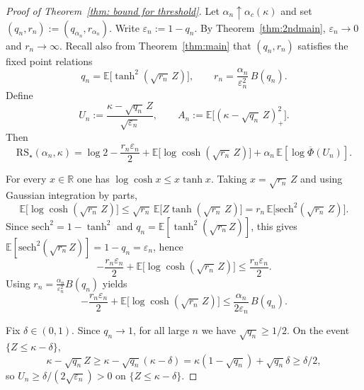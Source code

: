 \documentclass[11pt]{article}
\begin{document}
\begin{proof}[Proof of Theorem~\ref{thm: bound for threshold}]
Let $\alpha_n\uparrow \alpha_c(\kappa)$ and set $(q_n,r_n):=(q_{\alpha_n},r_{\alpha_n})$.
Write $\varepsilon_n:=1-q_n$. By Theorem~\ref{thm:2ndmain}, $\varepsilon_n\to 0$ and $r_n\to\infty$.
Recall also from Theorem~\ref{thm:main} that $(q_n,r_n)$ satisfies the fixed point relations
\[
q_n=\mathbb E\big[\tanh^2(\sqrt{r_n}\,Z)\big],
\qquad
r_n=\frac{\alpha_n}{\varepsilon_n^2}\,B(q_n).
\]
Define
\[
U_n:=\frac{\kappa-\sqrt{q_n}\,Z}{\sqrt{\varepsilon_n}},
\qquad
A_n:=\mathbb E\big[(\kappa-\sqrt{q_n}\,Z)_+^2\big].
\]
Then
\[
\mathrm{RS}_\star(\alpha_n,\kappa)
=
\log 2 -\frac{r_n\varepsilon_n}{2}
+\mathbb E\big[\log\cosh(\sqrt{r_n}\,Z)\big]
+\alpha_n\,\mathbb E\!\left[\log \overline{\Phi}(U_n)\right].
\]

For every $x\in\mathbb R$ one has $\log\cosh x\le x\tanh x$. Taking $x=\sqrt{r_n}\,Z$ and using Gaussian
integration by parts,
\begin{equation}\label{eq: cosh_sech_comparison-TOBECHECKED}
    \mathbb E\big[\log\cosh(\sqrt{r_n}\,Z)\big]
\le
\sqrt{r_n}\,\mathbb E\big[Z\tanh(\sqrt{r_n}\,Z)\big]
=
r_n\,\mathbb E\big[\mathrm{sech}^2(\sqrt{r_n}\,Z)\big].
\end{equation}
Since $\mathrm{sech}^2=1-\tanh^2$ and $q_n=\mathbb E[\tanh^2(\sqrt{r_n}Z)]$, this gives
$\mathbb E[\mathrm{sech}^2(\sqrt{r_n}Z)]=1-q_n=\varepsilon_n$, hence
\[
-\frac{r_n\varepsilon_n}{2}+\mathbb E\big[\log\cosh(\sqrt{r_n}\,Z)\big]
\le \frac{r_n\varepsilon_n}{2}.
\]
Using $r_n=\frac{\alpha_n}{\varepsilon_n^2}B(q_n)$ yields
\begin{equation}\label{eq:spin_bd_unif_nostep_revised-TOBECHECKED}
-\frac{r_n\varepsilon_n}{2}+\mathbb E\big[\log\cosh(\sqrt{r_n}\,Z)\big]
\le
\frac{\alpha_n}{2\varepsilon_n}\,B(q_n).
\end{equation}

Fix $\delta\in(0,1)$. Since $q_n\to 1$, for all large $n$ we have $\sqrt{q_n}\ge 1/2$. On the event
$\{Z\le \kappa-\delta\}$,
\[
\kappa-\sqrt{q_n}Z\ge \kappa-\sqrt{q_n}(\kappa-\delta)
=\kappa(1-\sqrt{q_n})+\sqrt{q_n}\delta\ge \delta/2,
\]
so $U_n\ge \delta/(2\sqrt{\varepsilon_n})>0$ on $\{Z\le \kappa-\delta\}$.


\end{proof}
\end{document}
